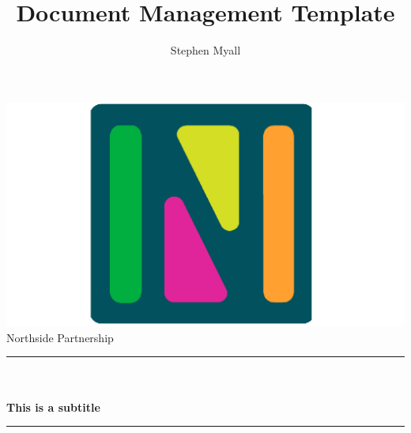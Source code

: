 \documentclass[a4paper,10pt]{article}
\title{Document Management Template}
\author{Stephen Myall}
\date{}
\makeatletter
\let\runtitle\@title
\makeatother
\begin{document}

\begin{titlepage}
	
	\centering
	    

        \vspace*{0.5 cm}
        
            \includegraphics[scale = 0.35]{logo.png}\\[1.0 cm]
    
            
            {\LARGE Northside Partnership}\\ %
            
            \vspace*{1.5 cm}
	
	        \rule{\linewidth}{0.2 mm} \\[0.4 cm]
	        { \Huge \bfseries \runtitle}\\
	         \vspace*{0.5 cm}
	        { \Large \bfseries This is a subtitle}\\
	        \rule{\linewidth}{0.2 mm} \\[1.5 cm]
	        

\end{titlepage}
\end{document}

